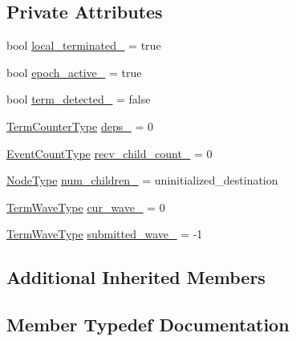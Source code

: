 \subsection*{Private Attributes}
\begin{DoxyCompactItemize}
\item 
bool \hyperlink{structvt_1_1term_1_1_term_state_a1c54c862157f705ad899011ce7603b07}{local\+\_\+terminated\+\_\+} = true
\item 
bool \hyperlink{structvt_1_1term_1_1_term_state_a96b88b09f0cb20e2901ff196d906b954}{epoch\+\_\+active\+\_\+} = true
\item 
bool \hyperlink{structvt_1_1term_1_1_term_state_a89d2e8ee209a8c6ad2ae2476373aebe8}{term\+\_\+detected\+\_\+} = false
\item 
\hyperlink{namespacevt_1_1term_a4fd378cdb0c36683afc1b3399d685f7f}{Term\+Counter\+Type} \hyperlink{structvt_1_1term_1_1_term_state_a0beb233e97e22d6c303397bca99c5176}{deps\+\_\+} = 0
\item 
\hyperlink{structvt_1_1term_1_1_term_state_a900fe4e9d98c81a320ae1dca27b71c2c}{Event\+Count\+Type} \hyperlink{structvt_1_1term_1_1_term_state_a1577cfd9aec1c289c145ca069c1f7298}{recv\+\_\+child\+\_\+count\+\_\+} = 0
\item 
\hyperlink{namespacevt_a866da9d0efc19c0a1ce79e9e492f47e2}{Node\+Type} \hyperlink{structvt_1_1term_1_1_term_state_a88e0527d43708487ae4f37c154753da9}{num\+\_\+children\+\_\+} = uninitialized\+\_\+destination
\item 
\hyperlink{namespacevt_1_1term_a4af17606966b2b5a6cba523bc39095a3}{Term\+Wave\+Type} \hyperlink{structvt_1_1term_1_1_term_state_a52c016e0a0c56fbbb1ef41838d985db3}{cur\+\_\+wave\+\_\+} = 0
\item 
\hyperlink{namespacevt_1_1term_a4af17606966b2b5a6cba523bc39095a3}{Term\+Wave\+Type} \hyperlink{structvt_1_1term_1_1_term_state_ae68bc728e864de5493e3fb61579c1c4a}{submitted\+\_\+wave\+\_\+} = -\/1
\end{DoxyCompactItemize}
\subsection*{Additional Inherited Members}


\subsection{Member Typedef Documentation}
\mbox{\label{structvt_1_1term_1_1_term_state_a900fe4e9d98c81a320ae1dca27b71c2c}} 
